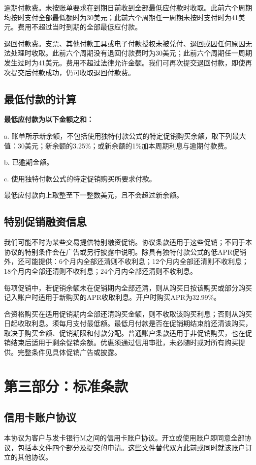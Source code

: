\documentclass[UTF8,fontset=none,11pt,a4paper]{ctexart}
\begin{document}
逾期付款费。未按账单要求在到期日前收到全部最低应付款时收取。此前六个周期均按时支付全部最低额时为30美元；此前六个周期任一周期未按时支付时为41美元。费用不超过当时到期的全部最\allowbreak\mbox{低应付款。}


退回付款费。支票、其他付款工具或电子付款授权未被兑付、退回或因任何原因无法处理时收取。此前六个周期没有退回付款费时为30美元；此前六个周期任一周期发生过时为41美元。费用不超过法律允许金额。我们可再次提交退回付款，即使再次提交后付款成功，仍可收取退\allowbreak\mbox{回付款费。}


\subsection*{最低付款的计算}
\textbf{最低应付款为以下金额之和：}


a. 账单所示新余额，不包括使用独特付款公式的特定促销购买余额，取下列最大值：30美元；新余额的3.25\%；或新余额的1\%加本周期利息与逾\allowbreak\mbox{期付款费。}


b. 已\allowbreak\mbox{逾期金额。}


c. 使用独特付款公式的特定促销购买所\allowbreak\mbox{要求付款。}


最低应付款向上取整至下一整数美元，且不会超\allowbreak\mbox{过新余额。}


\subsection*{特别促销融资信息}
我们可能不时为某些交易提供特别融资促销。协议条款适用于这些促销；不同于本协议的特别条件会在广告或另行披露中说明。除具有独特付款公式的低APR促销外，还可能提供：6个月内全部还清则不收利息；12个月内全部还清则不收利息；18个月内全部还清则不收利息；24个月内全部还清则\allowbreak\mbox{不收利息。}


每项促销中，若促销余额未在促销期内全部还清，则从购买日按该购买或部分购买记入账户时适用于新购买的APR收取利息。开户时购买APR为32.99\%。


合资格购买在适用促销期内全部还清购买金额，则不收取该购买利息；否则从购买日起收取利息。须每月支付最低额。最低月付款是否在促销期结束前还清该购买，取决于购买金额、促销期限和付款分配。普通账户条款适用于非促销购买，也在促销结束后适用于剩余促销余额。优惠须通过信用审批，未必随时或对所有购买提供。完整条件见具体促销广\allowbreak\mbox{告或披露。}


\section*{第三部分：标准条款}
\subsection*{信用卡账户协议}
本协议为客户与发卡银行M之间的信用卡账户协议。开立或使用账户即同意全部协议，包括本文件四个部分及提交的申请。这些文件替代双方此前或同时就该账户订立的\allowbreak\mbox{其他协议。}
\end{document}

